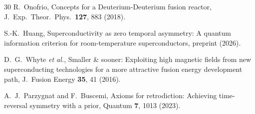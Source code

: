 \documentclass[prc,twocolumn,superscriptaddress,longbibliography,floatfix]{revtex4-2}
\begin{document}
\begin{thebibliography}{30}
R.~Onofrio,
Concepts for a Deuterium-Deuterium fusion reactor,
J.\ Exp.\ Theor.\ Phys.\ \textbf{127}, 883 (2018).

S.-K.~Huang,
Superconductivity as zero temporal asymmetry: A quantum information
criterion for room-temperature superconductors,
preprint (2026).

D.~G.~Whyte \textit{et al.},
Smaller \& sooner: Exploiting high magnetic fields from new
superconducting technologies for a more attractive fusion energy
development path,
J.\ Fusion Energy \textbf{35}, 41 (2016).

A.~J.~Parzygnat and F.~Buscemi,
Axioms for retrodiction: Achieving time-reversal symmetry with a prior,
Quantum \textbf{7}, 1013 (2023).

\end{thebibliography}
\end{document}
